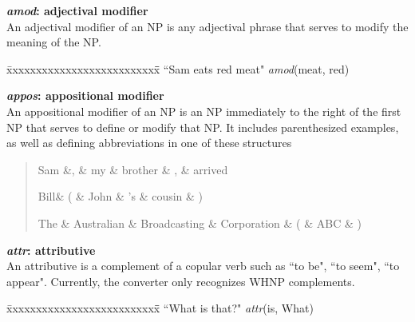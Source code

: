 \documentclass[11pt,letter]{article}
\begin{document}
\noindent\textbf{\emph{amod}: adjectival modifier}\\
An adjectival modifier of an NP is any adjectival phrase that serves to modify the meaning of the NP.
\begin{tabbing}
\hspace{1cm} \= xxxxxxxxxxxxxxxxxxxxxxxxxx\= \hspace{.5cm}\=  \kill
\> ``Sam eats red meat" \> \> \emph{amod}(meat, red)\\
\end{tabbing}

\noindent\textbf{\emph{appos}: appositional modifier}\\
An appositional modifier of an NP is an NP immediately to the right of
the first NP that serves to define or modify that NP. It includes
parenthesized examples, as well as defining abbreviations in one of
these structures
\begin{quote}
\begin{dependency}
   \begin{deptext}[column sep=0.2em]
      Sam \&, \& my \& brother \& , \& arrived \\
   \end{deptext}
\end{dependency}
\hspace*{1in}
\begin{dependency}
   \begin{deptext}[column sep=0.2em]
      Bill\& ( \& John \& 's \& cousin \& ) \\
   \end{deptext}
\end{dependency}

\begin{dependency}
   \begin{deptext}[column sep=0.2em]
      The \& Australian \& Broadcasting \& Corporation \& ( \& ABC \& ) \\
   \end{deptext}
\end{dependency}
\end{quote}

\noindent\textbf{\emph{attr}: attributive}\\
An attributive is a complement of a copular verb such as ``to be", ``to seem", ``to appear". Currently, the converter only recognizes WHNP complements.
\begin{tabbing}
\hspace{1cm} \= xxxxxxxxxxxxxxxxxxxxxxxxxx\= \hspace{.5cm}\=  \kill
\>  ``What is that?" \> \>  \emph{attr}(is, What)\\
\end{tabbing}
\end{document}
